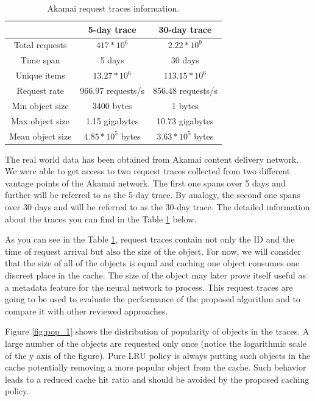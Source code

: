 \begin{table}[h!]
	\centering
	\begin{tabular}{| c | c | c |}
		\hline
		& 5-day trace & 30-day trace \\
		\hline 
		Total requests & $ 417 * 10^6 $ & $ 2.22 * 10^9 $ \\ 
		Time span & 5 days & 30 days \\
		Unique items & $ 13.27 * 10^6 $ & $ 113.15 * 10^6 $ \\
		Request rate & 966.97 requests/s & 856.48 requests/s \\
		Min object size & 3400 bytes & 1 bytes \\
		Max object size & 1.15 gigabytes & 10.73 gigabytes \\ 
		Mean object size & $ 4.85 * 10^5 $ bytes & $ 3.63 * 10^5 $ bytes \\
		\hline
	\end{tabular}
	\caption{Akamai request traces information.}
	\label{table:1}
\end{table}

The real world data has been obtained from Akamai content delivery network\cite{12}. We were able to get access to two request traces collected from two different vantage points of the Akamai network. The first one spans over 5 days and further will be referred to as the 5-day trace. By analogy, the second one spans over 30 days and will be referred to as the 30-day trace. The detailed information about the traces you can find in the Table \ref{table:1} below.



As you can see in the Table \ref{table:1}, request traces contain not only the ID and the time of request arrival but also the size of the object. For now, we will consider that the size of all of the objects is equal and caching one object consumes one discreet place in the cache. The size of the object may later prove itself useful as a metadata feature for the neural network to process. This request traces are going to be used to evaluate the performance of the proposed algorithm and to compare it with other reviewed approaches.

Figure \ref{fig:pop_1} shows the distribution of popularity of objects in the traces. A large number of the objects are requested only once (notice the logarithmic scale of the y axis of the figure). Pure LRU policy is always putting such objects in the cache potentially removing a more popular object from the cache. Such behavior leads to a reduced cache hit ratio and should be avoided by the proposed caching policy.